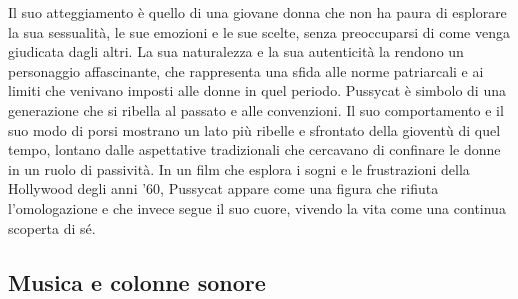 \documentclass[12pt]{article} %
\begin{document}
\begin{flushleft}
    Il suo atteggiamento è quello di una giovane donna che non ha paura di esplorare la sua sessualità, le sue emozioni e le sue scelte, senza preoccuparsi di come venga giudicata dagli altri. La sua naturalezza e la sua autenticità la rendono un personaggio affascinante, che rappresenta una sfida alle norme patriarcali e ai limiti che venivano imposti alle donne in quel periodo. Pussycat è simbolo di una generazione che si ribella al passato e alle convenzioni. Il suo comportamento e il suo modo di porsi mostrano un lato più ribelle e sfrontato della gioventù di quel tempo, lontano dalle aspettative tradizionali che cercavano di confinare le donne in un ruolo di passività. In un film che esplora i sogni e le frustrazioni della Hollywood degli anni '60, Pussycat appare come una figura che rifiuta l’omologazione e che invece segue il suo cuore, vivendo la vita come una continua scoperta di sé.

    
    
    
    

\end{flushleft}
\break

\subsection{Musica e colonne sonore}
\end{document}
